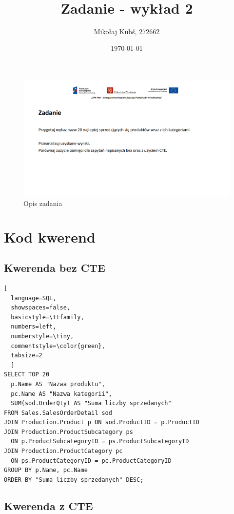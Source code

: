 \documentclass[a4paper,12pt]{article}
\title{Zadanie - wykład 2}
\author{Mikołaj Kubś, 272662}
\date{\today}
\begin{document}
\maketitle

\begin{figure}[H]
  \centering
  \includegraphics[width=1\textwidth]{images/task.png}
  \caption{Opis zadania}
\end{figure}

\section{Kod kwerend}

\subsection{Kwerenda bez CTE}

\begin{lstlisting}[
  language=SQL,
  showspaces=false,
  basicstyle=\ttfamily,
  numbers=left,
  numberstyle=\tiny,
  commentstyle=\color{green},
  tabsize=2
  ]
SELECT TOP 20 
  p.Name AS "Nazwa produktu", 
  pc.Name AS "Nazwa kategorii", 
  SUM(sod.OrderQty) AS "Suma liczby sprzedanych"
FROM Sales.SalesOrderDetail sod
JOIN Production.Product p ON sod.ProductID = p.ProductID
JOIN Production.ProductSubcategory ps 
  ON p.ProductSubcategoryID = ps.ProductSubcategoryID
JOIN Production.ProductCategory pc 
  ON ps.ProductCategoryID = pc.ProductCategoryID
GROUP BY p.Name, pc.Name
ORDER BY "Suma liczby sprzedanych" DESC;
\end{lstlisting}

\subsection{Kwerenda z CTE}
\end{document}
